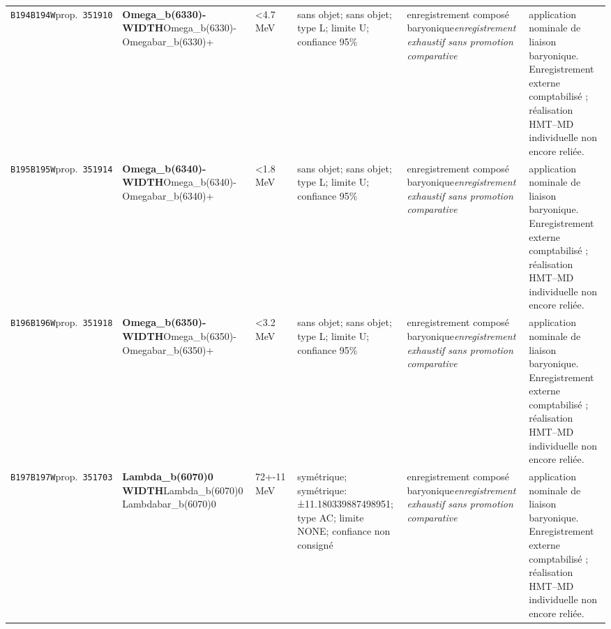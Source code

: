 \begin{landscape}
\begin{longtable}{L{1.85cm}L{4.45cm}L{2.35cm}L{4.05cm}L{3.35cm}L{7.15cm}}
\texttt{B194}\newline \texttt{B194W}\newline prop.\ \texttt{351910} & \textbf{Omega\_\allowbreak{}b(6330)- WIDTH}\newline Omega\_\allowbreak{}b(6330)- \textbar{}\allowbreak{} Omegabar\_\allowbreak{}b(6330)+ & \textless{}4.7\,MeV & sans objet; sans objet; type L; limite U; confiance 95\% & enregistrement composé baryonique\newline \emph{enregistrement exhaustif sans promotion comparative} & application nominale de liaison baryonique. Enregistrement externe comptabilisé ; réalisation HMT--MD individuelle non encore reliée. \\
\texttt{B195}\newline \texttt{B195W}\newline prop.\ \texttt{351914} & \textbf{Omega\_\allowbreak{}b(6340)- WIDTH}\newline Omega\_\allowbreak{}b(6340)- \textbar{}\allowbreak{} Omegabar\_\allowbreak{}b(6340)+ & \textless{}1.8\,MeV & sans objet; sans objet; type L; limite U; confiance 95\% & enregistrement composé baryonique\newline \emph{enregistrement exhaustif sans promotion comparative} & application nominale de liaison baryonique. Enregistrement externe comptabilisé ; réalisation HMT--MD individuelle non encore reliée. \\
\texttt{B196}\newline \texttt{B196W}\newline prop.\ \texttt{351918} & \textbf{Omega\_\allowbreak{}b(6350)- WIDTH}\newline Omega\_\allowbreak{}b(6350)- \textbar{}\allowbreak{} Omegabar\_\allowbreak{}b(6350)+ & \textless{}3.2\,MeV & sans objet; sans objet; type L; limite U; confiance 95\% & enregistrement composé baryonique\newline \emph{enregistrement exhaustif sans promotion comparative} & application nominale de liaison baryonique. Enregistrement externe comptabilisé ; réalisation HMT--MD individuelle non encore reliée. \\
\texttt{B197}\newline \texttt{B197W}\newline prop.\ \texttt{351703} & \textbf{Lambda\_\allowbreak{}b(6070)0 WIDTH}\newline Lambda\_\allowbreak{}b(6070)0 \textbar{}\allowbreak{} Lambdabar\_\allowbreak{}b(6070)0 & 72+-11\,MeV & symétrique; symétrique: ±11.180339887498951; type AC; limite NONE; confiance non consigné & enregistrement composé baryonique\newline \emph{enregistrement exhaustif sans promotion comparative} & application nominale de liaison baryonique. Enregistrement externe comptabilisé ; réalisation HMT--MD individuelle non encore reliée. \\

\end{longtable}
\end{landscape}
